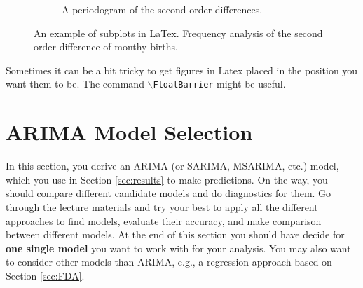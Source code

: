 \documentclass[a4paper]{article}
\begin{document}
\begin{figure}[h!]
\begin{subfigure}[b]{0.45\textwidth}
        \caption{A periodogram of the second order differences. }
        \label{fig:diff2_birth_pdg}
    \end{subfigure}
		\caption{An example of subplots in
		LaTex. Frequency analysis of the second order difference of monthy births. }
		\label{fig:fd_analysis}
\end{figure}

Sometimes it can be a bit tricky to get figures in Latex placed in the position you want them to be. The command \texttt{$\backslash$FloatBarrier} might be useful.

\FloatBarrier

\section{ARIMA Model Selection}
\label{sec:arima_model}
In this section, you derive an ARIMA (or SARIMA, MSARIMA, etc.) model, which you use in Section \ref{sec:results} to make predictions.
%
On the way, you should compare different candidate models and do diagnostics for them.
%
Go through the lecture materials and try your best to apply all the different approaches to find models, evaluate their accuracy, and make comparison between different models.
%
At the end of this section you should have decide for \textbf{one single model} you want to work with for your analysis. You may also want to consider other models than ARIMA, e.g., a regression approach based on Section \ref{sec:FDA}.
%
%


\end{document}
